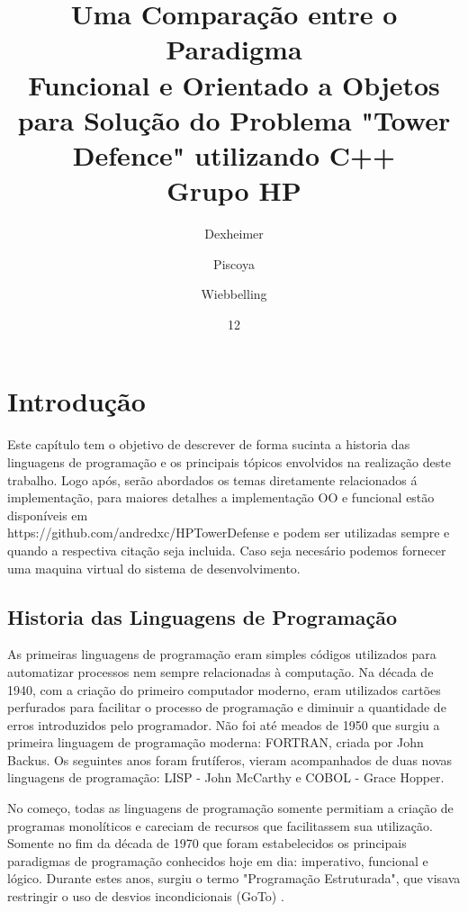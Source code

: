 \documentclass[rel_mlp]{iiufrgs}
\title{Uma Comparação entre o Paradigma\\ Funcional e Orientado a Objetos para Solução do Problema "Tower Defence" utilizando C++ \\ \vspace{0.4cm} Grupo HP}
\author{Dexheimer}{André}
\author{Piscoya}{Gabriel}
\author{Wiebbelling}{Rodrigo}
\date{12}{2017}
\begin{document}
\maketitle


\tableofcontents









\chapter{Introdução} \label{intro}
Este capítulo tem o objetivo de descrever de forma sucinta a historia das linguagens de programação e os principais tópicos envolvidos na realização deste trabalho. Logo após, serão abordados os temas diretamente relacionados á implementação, para maiores detalhes a implementação OO e funcional estão disponíveis em \\ https://github.com/andredxc/HPTowerDefense e podem ser utilizadas sempre e quando a respectiva citação seja incluida.
Caso seja necesário podemos fornecer uma maquina virtual do sistema de desenvolvimento.
\section{Historia das Linguagens de Programação}
As primeiras linguagens de programação eram simples códigos utilizados para automatizar processos nem sempre relacionadas à computação. Na década de 1940, com a criação do primeiro computador moderno, eram utilizados cartões perfurados para facilitar o processo de programação e diminuir a quantidade de erros introduzidos pelo programador. Não foi até meados de 1950 que surgiu a primeira linguagem de programação moderna: FORTRAN, criada por John Backus. Os seguintes anos foram frutíferos, vieram acompanhados de duas novas linguagens de programação: LISP - John McCarthy e COBOL - Grace Hopper.

No começo, todas as linguagens de programação somente permitiam a criação de programas monolíticos e careciam de recursos que facilitassem sua utilização. Somente no fim da década de 1970 que foram estabelecidos os principais paradigmas de programação conhecidos hoje em dia: imperativo, funcional e lógico.
Durante estes anos, surgiu o termo "Programação Estruturada", que visava restringir o uso de desvios incondicionais (GoTo) \cite{organick2014programming}.
\end{document}
